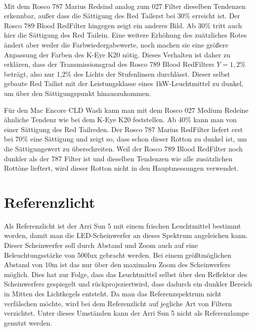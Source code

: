 \\
Mit dem Rosco 787 \glqq Marius Red\grqq sind analog zum 027 Filter dieselben Tendenzen erkennbar, außer dass die Sättigung des \glqq Red Tail\grqq erst bei 30\% erreicht ist.
Der Rosco 789 \glqq Blood Red\grqq Filter hingegen zeigt ein anderes Bild. Ab 30\% tritt auch hier die Sättigung des \glqq Red Tail\grqq ein. Eine weitere Erhöhung des zuätzliches Rotes ändert aber weder die Farbwiedergabewerte, noch machen sie eine größere Anpassung der Farben des K-Eye K20 nötig. Dieses Verhalten ist daher zu erklären, dass der Transmissionsgrad des Rosco 789 \glqq Blood Red\grqq Filters  $Y=1,2\%$ beträgt, also nur 1,2\% des Lichts der Stufenlinsen durchlässt. Dieser selbst gebaute \glqq Red Tail\grqq ist mit der Leistungsklasse eines 1kW-Leuchtmittel zu dunkel, um über den Sättigungspunkt hinauszukommen.  


Für den Mac Encore CLD Wash kann man mit dem Rosco 027 \glqq Medium Red\grqq eine ähnliche Tendenz wie bei dem K-Eye K20 feststellen. Ab 40\% kann man von einer Sättigung des \glqq Red Tail\grqq reden. Der Rosco 787 \glqq Marius Red\grqq Filter liefert erst bei 70\% eine Sättigung und zeigt so, dass schon dieser Rotton zu dunkel ist, um die Sättigungswert zu überschreiten. Weil der Rosco 789 \glqq Blood Red\grqq Filter noch dunkler als der 787 Filter ist und dieselben Tendenzen wie alle zusätzlichen Rottöne lieftert, wird dieser Rotton nicht in den Hauptmessungen verwendet. 



\section{Referenzlicht}
\label{sec_reflicht}
Als Referenzlicht ist der Arri Sun 5 mit einem frischen Leuchtmittel bestimmt worden, damit man die LED-Scheinwerfer an dieses Spektrum angeleichen kann. Dieser Scheinwerfer soll durch Abstand und Zoom auch auf eine Beleuchtungsstärke von 500lux gebracht werden. Bei einem größtmöglichen Abstand von 10m ist das nur über den maximalen Zoom des Scheinwerfers möglich. Dies hat zur Folge, dass das Leuchtmittel selbst über den Reflektor des Scheinwerfers gespiegelt und \glqq rückprojeziert\grqq wird, dass dadurch ein dunkler Bereich in Mitten des Lichtkegels entsteht. Da man das Referenzspektrum nicht verfälschen möchte, wird bei dem Referenzlicht auf jegliche Art von Filtern verzichtet. Unter dieses Umständen kann der Arri Sun 5 nicht als Referenzlampe genutzt werden.

